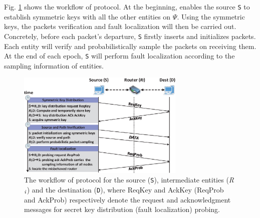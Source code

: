 Fig. \ref{workflow} shows the workflow of \name{} protocol. At the beginning, \name{} enables the source {\tt S} to establish symmetric keys with all the other entities on $\Psi$.  
Using the symmetric keys, the packets verification and fault localization will then be carried out. Concretely, before each packet's departure, {\tt S} firstly inserts and initializes \name{} packets. Each entity will verify and probabilistically sample the packets on receiving them. At the end of each epoch, {\tt S} will perform fault localization according to the sampling information of entities.
\begin{figure}%
\begin{center}
\includegraphics[width=8cm]{visio/workflow7.eps}
\caption{The workflow of \name{} protocol for the source ({\tt S}), intermediate entities (\emph{R}$_\emph{i}$) and the destination ({\tt D}), where ReqKey and AckKey (ReqProb and AckProb) respectively denote the request and acknowledgment messages for secret key distribution (fault localization) probing.}\label{workflow}
\end{center}
\vspace{-3mm}
\end{figure}\\
